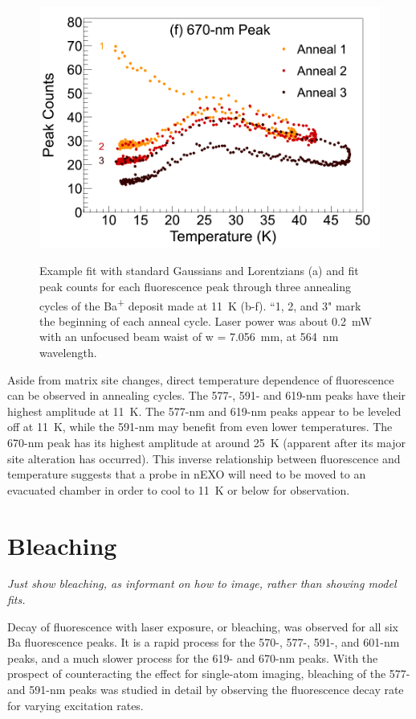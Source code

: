 \begin{figure}
                ~
                \includegraphics[width=.5\textwidth]{figures/anneal_670peak.png}
                \caption{Example fit with standard Gaussians and Lorentzians (a) and fit peak counts for each fluorescence peak through three annealing cycles of the Ba\textsuperscript{+} deposit made at 11~K (b-f).  ``1, 2, and 3" mark the beginning of each anneal cycle.  Laser power was about 0.2~mW with an unfocused beam waist of w = 7.056~mm, at 564~nm wavelength.}
\label{fig:annealGrn}
\end{figure}

Aside from matrix site changes, direct temperature dependence of fluorescence can be observed in annealing cycles.  The 577-, 591- and 619-nm peaks have their highest amplitude at 11~K.  The 577-nm and 619-nm peaks appear to be leveled off at 11~K, while the 591-nm may benefit from even lower temperatures.  The 670-nm peak has its highest amplitude at around 25~K (apparent after its major site alteration has occurred).  This inverse relationship between fluorescence and temperature suggests that a probe in nEXO will need to be moved to an evacuated chamber in order to cool to 11~K or below for observation.  



\section{Bleaching}
\label{sec:bleaching}

\emph{\color{gray}Just show bleaching, as informant on how to image, rather than showing model fits.}

Decay of fluorescence with laser exposure, or bleaching, was observed for all six Ba fluorescence peaks.  It is a rapid process for the 570-, 577-, 591-, and 601-nm peaks, and a much slower process for the 619- and 670-nm peaks.  With the prospect of counteracting the effect for single-atom imaging, bleaching of the 577- and 591-nm peaks was studied in detail by observing the fluorescence decay rate for varying excitation rates.  

